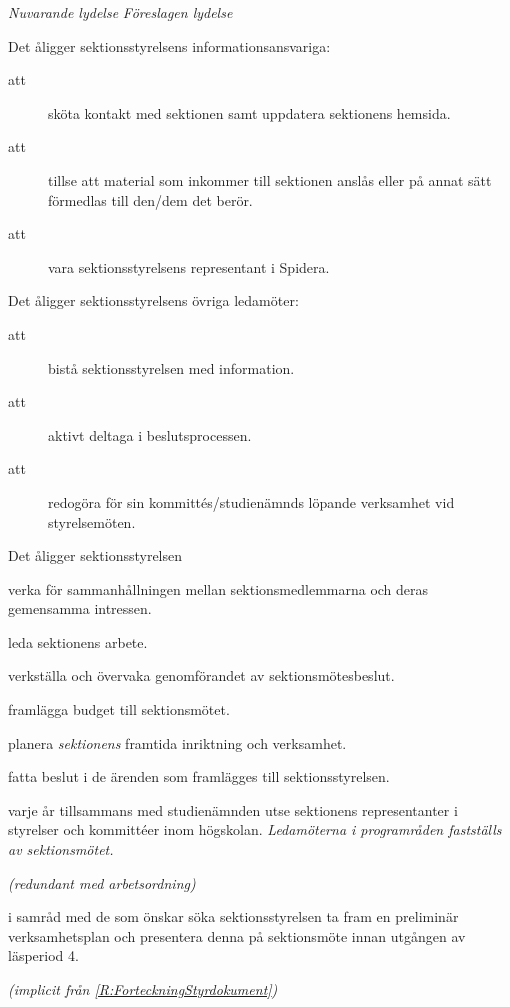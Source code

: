 \documentclass{article}
\newenvironment{lydelse}
    {\begin{paracol}{2}%
        \emph{Nuvarande lydelse}%
        \switchcolumn%
        \emph{Föreslagen lydelse}%
    \end{paracol}%
    \begin{enumerate}[label=\thesubsection.\arabic*]%
    \begin{paracol}{2}%
    }{\end{paracol}\end{enumerate}}
\begin{document}
\begin{lydelse}
    \item Det åligger sektionsstyrelsens informationsansvariga:  
	\begin{description}
		\item[att] sköta kontakt med sektionen samt uppdatera sektionens hemsida. 
		\item[att] tillse att material som inkommer till sektionen anslås eller på annat sätt förmedlas  till den/dem det berör.
		\item[att] vara sektionsstyrelsens representant i Spidera.
	\end{description}    

    \item Det åligger sektionsstyrelsens övriga ledamöter:
	\begin{description}
		\item[att] bistå sektionsstyrelsen med information.
		\item[att] aktivt deltaga i beslutsprocessen.
		\item[att] redogöra för sin kommittés/studienämnds löpande verksamhet vid styrelsemöten.
	\end{description}
	\setcounter{section}{3}
    \switchcolumn
    \setcounter{enumi}{0}
    \item Det åligger sektionsstyrelsen
    \begin{aligganden}
        \item verka för sammanhållningen mellan sektionsmedlemmarna och deras gemensamma intressen.
    	\item leda sektionens arbete.
    	\item verkställa och övervaka genomförandet av sektionsmötesbeslut.
    	\item framlägga budget till sektionsmötet.
    	\item planera \emph{sektionens} framtida inriktning och verksamhet.
    	\item fatta beslut i de ärenden som framlägges till sektionsstyrelsen.
    	\item varje år tillsammans med studienämnden utse sektionens representanter i styrelser och kommittéer inom högskolan.
    	    \emph{Ledamöterna i programråden fastställs av sektionsmötet.} \vspace{1.6em}
    	\item[] \emph{(redundant med arbetsordning)}\vspace{8.7ex}
    	\item i samråd med de som önskar söka sektionsstyrelsen ta fram en preliminär verksamhetsplan och presentera denna på sektionsmöte innan utgången av läsperiod 4.\vspace{0.9ex}
    	\item[] \emph{(implicit från \ref{R:ForteckningStyrdokument})}
    \end{aligganden}


\end{lydelse}
\end{document}
